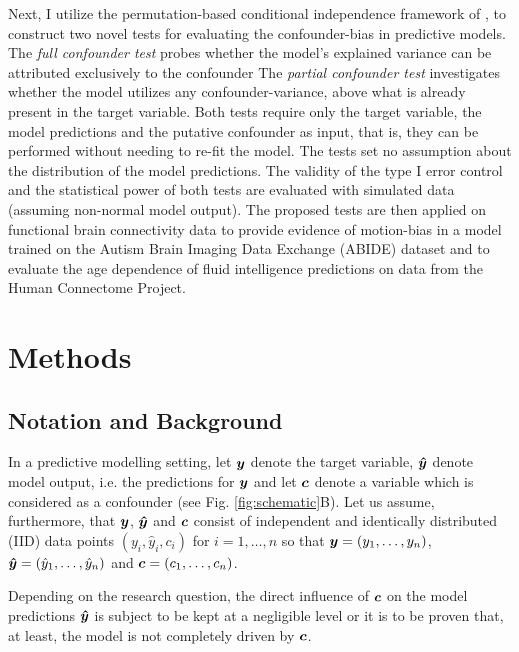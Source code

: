\documentclass{article}
\begin{document}
Next, I utilize the permutation-based conditional independence framework of \cite{berrett2020conditional}, to construct two novel tests for evaluating the confounder-bias in predictive models.
The \emph{full confounder test} probes whether the model's explained variance can be attributed exclusively to the confounder
The \emph{partial confounder test} investigates whether the model utilizes any confounder-variance, above what is already present in the target variable.
Both tests require only the target variable, the model predictions and the putative confounder as input, that is, they can be performed without needing to re-fit the model.
The tests set no assumption about the distribution of the model predictions.
The validity of the type I error control and the statistical power of both tests are evaluated with simulated data (assuming non-normal model output).
The proposed tests are then applied on functional brain connectivity data to provide evidence of motion-bias in a model trained on the Autism Brain Imaging Data Exchange (ABIDE) dataset \citep{di2014autism} and to evaluate the age dependence of fluid intelligence predictions on data from the Human Connectome Project.

\section{Methods}

\subsection{Notation and Background}

In a predictive modelling setting, let $\boldsymbol{y}$ denote the target variable, $\boldsymbol{\hat{y}}$ denote model output, i.e. the predictions for $\boldsymbol{y}$ and let $\boldsymbol{c}$ denote a variable which is considered as a confounder (see Fig. \ref{fig:schematic}B). Let us assume, furthermore, that $\boldsymbol{y}$, $\boldsymbol{\hat{y}}$ and $\boldsymbol{c}$ consist of independent and identically distributed (IID) data points $(y_i, \hat{y}_i, c_i)$ for $i=1, \dots , n$ so that $\boldsymbol{y}=(y_1, \dots ,y_n)$, $\boldsymbol{\hat{y}}=(\hat{y}_1, \dots, \hat{y}_n)$ and $\boldsymbol{c}=(c_1, \dots, c_n)$. 

Depending on the research question, the direct influence of $\boldsymbol{c}$ on the model predictions $\boldsymbol{\hat{y}}$ is subject to be kept at a negligible level or it is to be proven that, at least, the model is not completely driven by $\boldsymbol{c}$.
\end{document}
